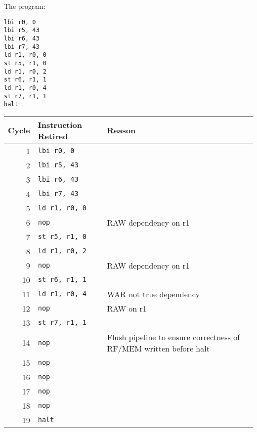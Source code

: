 \documentclass[11pt]{article}
\author{Nicholas Sielicki}
\date{\today}
\title{}
\begin{document}
\tableofcontents

The program:
\begin{verbatim}
lbi r0, 0
lbi r5, 43
lbi r6, 43
lbi r7, 43        
ld r1, r0, 0
st r5, r1, 0
ld r1, r0, 2
st r6, r1, 1
ld r1, r0, 4
st r7, r1, 1
halt
\end{verbatim}



\begin{center}
\begin{tabular}{rll}
Cycle & Instruction Retired & Reason\\
\hline
1 & \texttt{lbi r0, 0} & \\
2 & \texttt{lbi r5, 43} & \\
3 & \texttt{lbi r6, 43} & \\
4 & \texttt{lbi r7, 43} & \\
5 & \texttt{ld r1, r0, 0} & \\
6 & \texttt{nop} & RAW dependency on r1\\
7 & \texttt{st r5, r1, 0} & \\
8 & \texttt{ld r1, r0, 2} & \\
9 & \texttt{nop} & RAW dependency on r1\\
10 & \texttt{st r6, r1, 1} & \\
11 & \texttt{ld r1, r0, 4} & WAR not true dependency\\
12 & \texttt{nop} & RAW on r1\\
13 & \texttt{st r7, r1, 1} & \\
14 & \texttt{nop} & Flush pipeline to ensure correctness of RF/MEM written before halt\\
15 & \texttt{nop} & \\
16 & \texttt{nop} & \\
17 & \texttt{nop} & \\
18 & \texttt{nop} & \\
19 & \texttt{halt} & \\
\end{tabular}
\end{center}
\end{document}
